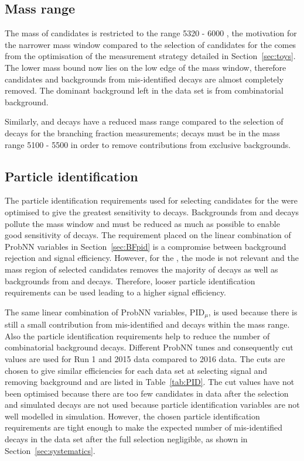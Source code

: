 \subsection{Mass range}
\label{sec:ELmass}
The mass of \bsmumu candidates is restricted to the range 5320 - 6000 \mevcc, the motivation for the narrower mass window compared to the selection of candidates for the \BFm comes from the optimisation of the measurement strategy detailed in Section~\ref{sec:toys}. The lower mass bound now lies on the low edge of the \bs mass window, therefore \bdmumu candidates and backgrounds from mis-identified decays are almost completely removed. The dominant background left in the data set is from combinatorial background. %

Similarly, \bdkpi and \bskk decays have a reduced mass range compared to the selection of \bhh decays for the branching fraction measurements; \bhh decays must be in the mass range 5100 - 5500 \mevcc in order to remove contributions from exclusive backgrounds.

\subsection{Particle identification}
\label{sec:ELpid}
The particle identification requirements used for selecting candidates for the \BFm were optimised to give the greatest sensitivity to \bdmumu decays. Backgrounds from \bhh and \lambdab decays pollute the \bd mass window and must be reduced as much as possible to enable good sensitivity of \bdmumu decays. The requirement placed on the linear combination of ProbNN variables in Section~\ref{sec:BFpid} is a compromise between background rejection and signal efficiency. However, for the \elm, the \bd mode is not relevant and the mass region of selected candidates removes the majority of \bdmumu decays as well as backgrounds from \bhh and \lambdab decays. Therefore, looser particle identification requirements can be used leading to a higher signal efficiency.%

The same linear combination of ProbNN variables, PID$_{\mu}$, is used because there is still a small contribution from mis-identified \bhh and \lambdab decays within the mass range. Also the particle identification requirements help to reduce the number of combinatorial background decays. Different ProbNN tunes and consequently cut values are used for Run 1 and 2015 data compared to 2016 data. The cuts are chosen to give similar efficiencies for each data set at selecting signal and removing background and are listed in Table~\ref{tab:PID}. The cut values have not been optimised because there are too few candidates in data after the selection and simulated decays are not used because particle identification variables are not well modelled in simulation. However, the chosen particle identification requirements are tight enough to make the expected number of mis-identified decays in the data set after the full selection negligible, as shown in Section~\ref{sec:systematics}. 

